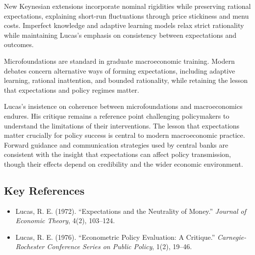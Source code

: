 New Keynesian extensions incorporate nominal rigidities while preserving rational
expectations, explaining short-run fluctuations through price stickiness and
menu costs. Imperfect knowledge and adaptive learning models relax strict
rationality while maintaining Lucas's emphasis on consistency between
expectations and outcomes.

Microfoundations are standard in graduate macroeconomic training. Modern
debates concern alternative ways of forming expectations, including adaptive
learning, rational inattention, and bounded rationality, while retaining the
lesson that expectations and policy regimes matter.

Lucas's insistence on coherence between microfoundations and macroeconomics
endures. His critique remains a reference point challenging policymakers to
understand the limitations of their interventions. The lesson that expectations
matter crucially for policy success is central to modern macroeconomic practice.
Forward guidance and communication strategies used by central banks are
consistent with the insight that expectations can affect policy transmission,
though their effects depend on credibility and the wider economic environment.

\subsection*{Key References}
\begin{itemize}
    \item Lucas, R. E. (1972). ``Expectations and the Neutrality of Money.'' \textit{Journal of Economic Theory}, 4(2), 103--124.
    \item Lucas, R. E. (1976). ``Econometric Policy Evaluation: A Critique.'' \textit{Carnegie-Rochester Conference Series on Public Policy}, 1(2), 19--46.
\end{itemize}

